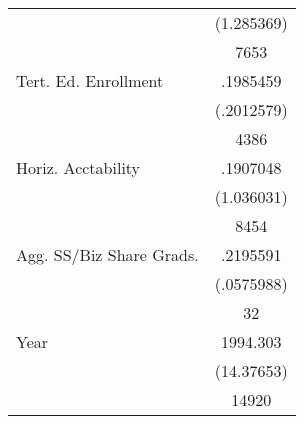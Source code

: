 {\begin{longtable}{l*{1}{c}}
                    &  (1.285369)\\
                    &        7653\\
Tert. Ed. Enrollment&    .1985459\\
                    &  (.2012579)\\
                    &        4386\\
Horiz. Acctability  &    .1907048\\
                    &  (1.036031)\\
                    &        8454\\
Agg. SS/Biz Share Grads.&    .2195591\\
                    &  (.0575988)\\
                    &          32\\
Year                &    1994.303\\
                    &  (14.37653)\\
                    &       14920\\
\hline\hline
\end{longtable}
}
